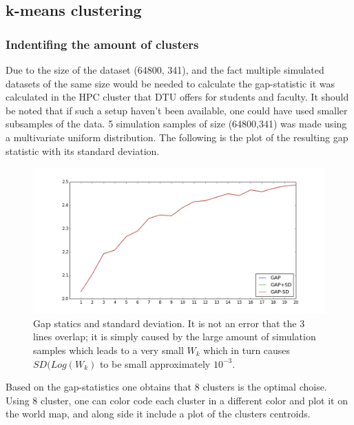 \subsection{k-means clustering}

\subsubsection{Indentifing the amount of clusters}
Due to the size of the dataset (64800, 341), and the fact multiple simulated datasets of the same size would be needed to calculate the gap-statistic it was calculated in the HPC cluster that DTU offers for students and faculty.
It should be noted that if such a setup haven't been available, one could have used smaller subsamples of the data.
5 simulation samples of size (64800,341) was made using a multivariate uniform distribution. The following is the plot of the resulting gap statistic with its standard deviation.
\begin{figure}[H]
	\center
	\includegraphics[width=\textwidth]{figures/kmeans-gap.png}
	\caption{Gap statics and standard deviation. It is not an error that the 3 lines overlap; it is simply caused by the large amount of simulation samples which leads to a very small $W_k$ which in turn causes $SD(Log(W_k)$ to be small approximately $10^{-3}$.}
\end{figure}

Based on the gap-statistics one obtains that 8 clusters is the optimal choise. Using 8 cluster, one can color code each cluster in a different color and plot it on the world map, and along side it include a plot of the clusters centroids.

